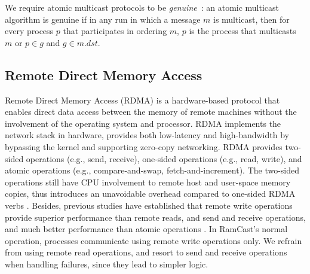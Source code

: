 We require atomic multicast protocols to be \emph{genuine}~\cite{GS01b}: 
an atomic multicast algorithm is genuine if in any run in which a message $m$ is 
multicast, then for every process $p$ that participates in ordering $m$, $p$ is the process that multicasts $m$ or $p \in g$ and $g \in m.dst$.

\subsection{Remote Direct Memory Access}
\label{sec:rdma}

Remote Direct Memory Access (RDMA) is a hardware-based protocol that enables direct data access between the memory of remote machines without the involvement of the operating system and processor. 
RDMA implements the network stack in hardware, provides both low-latency and high-bandwidth by bypassing the kernel and supporting zero-copy networking.
RDMA provides two-sided operations (e.g., send, receive), one-sided operations (e.g., read, write), and atomic operations (e.g., compare-and-swap, fetch-and-increment). The two-sided operations still have CPU involvement to remote host and user-space memory copies, thus introduces an unavoidable overhead compared to one-sided RDMA verbs \cite{FaRM}.
Besides, previous studies have established that remote write operations provide superior performance than remote reads, and send and receive operations, and much better performance than atomic operations \cite{kalia2014using, kalia2016design, mitchell2013using}.
In RamCast's normal operation, processes communicate using remote write operations only.
We refrain from using remote read operations, and resort to send and receive operations when handling failures, since they lead to simpler logic.

